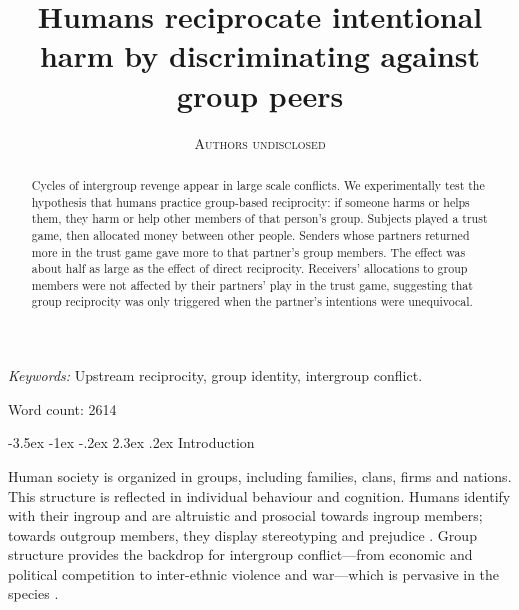 \documentclass[12pt,a4paper]{article}\usepackage[]{graphicx}\usepackage[]{color}
\title{\bf\sffamily Humans reciprocate intentional harm by discriminating against group peers}
\author{\textsc{Authors undisclosed}}
\date{}%
\makeatletter
\renewcommand\section{\@startsection {section}{1}{\z@}%
{-3.5ex \@plus -1ex \@minus -.2ex}%
{2.3ex \@plus.2ex}%
{\bf\sffamily\Large}}
\makeatother
\begin{document}
\maketitle

\begin{abstract}
Cycles of intergroup revenge appear in large scale conflicts. We experimentally
test the hypothesis that humans practice group-based reciprocity: if someone
harms or helps them, they harm or help other members of that person's group.
Subjects played a trust game, then allocated money between other people. Senders
whose partners returned more in the trust game gave more to that partner's group
members. The effect was about half as large as the effect of direct reciprocity.
Receivers' allocations to group members were not affected by their partners’ 
play in the trust game, suggesting that group reciprocity was only triggered when the
partner's intentions were unequivocal.
\end{abstract}

\emph{Keywords:} Upstream reciprocity, group identity, intergroup conflict.

Word count: 2614



\newpage

\section{Introduction}

Human society is organized in groups, including families, clans, firms and nations. This
structure is reflected in individual behaviour and cognition. Humans identify
with their ingroup and are altruistic and prosocial towards ingroup members;
towards outgroup members, they display stereotyping and prejudice
\citep{tajfel1979integrative,yamagishi2000thegroup,balliet2014ingroup,DeDreu2014,chen2009group,chen2011potential}.
Group structure provides the backdrop for intergroup conflict---from economic
and political competition to inter-ethnic violence and war---which is pervasive
in the species \citep{world_bank_world_2011}.
\end{document}
